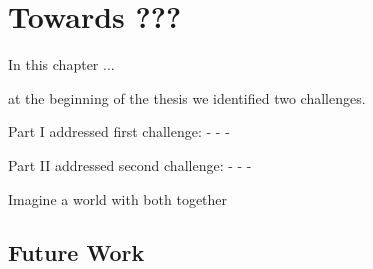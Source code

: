 
\chapter{Towards ???}

 \label{ch:seventh} %

In this chapter ...


at the beginning of the thesis we identified two challenges.

Part I addressed first challenge:
 -
 -
 -


Part II addressed second challenge:
 -
 -
 -


Imagine a world with both together

\section{Future Work}
\label{section:future-work}


